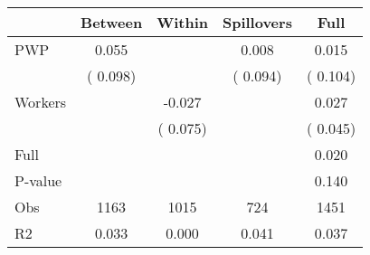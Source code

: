 
\begin{tabular}{l*{4}{c}}\hline&\multicolumn{1}{c}{Between}&\multicolumn{1}{c}{Within}&\multicolumn{1}{c}{Spillovers}&\multicolumn{1}{c}{Full}\\ \hline
 PWP           &              0.055      &                                               &        0.008 &         0.015                            \\ 
                               &        (       0.098)           &                                       &       (       0.094)     &      (       0.104)                                           \\ 
 Workers       &                                               &       -0.027    &                                &             0.027                            \\ 
                               &                                               & (       0.075)                  &                                        &      (       0.045)                                           \\ 
\hline                                                                                                                                                                                                                                            
 Full                  &                                               &                                               &                                        &             0.020                                     \\ 
 P-value               &                                               &                                               &                                        &             0.140                                           \\ 
 Obs                   &               1163               &       1015                       &       724                &              1451                                               \\ 
 R2                    &                      0.033              &              0.000                      &              0.041               &                     0.037                                              \\ 
\hline \end{tabular}                                                                                                                                                                                                              